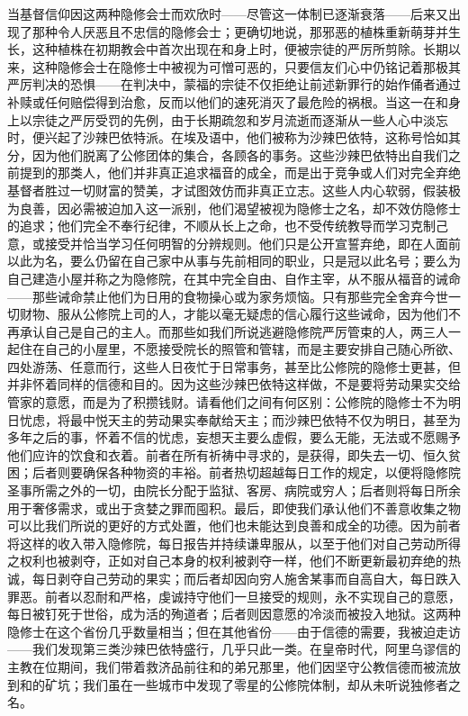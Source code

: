 当基督信仰因这两种隐修会士而欢欣时——尽管这一体制已逐渐衰落——后来又出现了那种令人厌恶且不忠信的隐修会士；更确切地说，那邪恶的植株重新萌芽并生长，这种植株在初期教会中首次出现在和身上时，便被宗徒的严厉所剪除。长期以来，这种隐修会士在隐修士中被视为可憎可恶的，只要信友们心中仍铭记着那极其严厉判决的恐惧——在判决中，蒙福的宗徒不仅拒绝让前述新罪行的始作俑者通过补赎或任何赔偿得到治愈，反而以他们的速死消灭了最危险的祸根。当这一在和身上以宗徒之严厉受罚的先例，由于长期疏忽和岁月流逝而逐渐从一些人心中淡忘时，便兴起了沙辣巴依特派。在埃及语中，他们被称为沙辣巴依特，这称号恰如其分，因为他们脱离了公修团体的集合，各顾各的事务。这些沙辣巴依特出自我们之前提到的那类人，他们并非真正追求福音的成全，而是出于竞争或人们对完全弃绝基督者胜过一切财富的赞美，才试图效仿而非真正立志。这些人内心软弱，假装极为良善，因必需被迫加入这一派别，他们渴望被视为隐修士之名，却不效仿隐修士的追求；他们完全不奉行纪律，不顺从长上之命，也不受传统教导而学习克制己意，或接受并恰当学习任何明智的分辨规则。他们只是公开宣誓弃绝，即在人面前以此为名，要么仍留在自己家中从事与先前相同的职业，只是冠以此名号；要么为自己建造小屋并称之为隐修院，在其中完全自由、自作主宰，从不服从福音的诫命——那些诫命禁止他们为日用的食物操心或为家务烦恼。只有那些完全舍弃今世一切财物、服从公修院上司的人，才能以毫无疑虑的信心履行这些诫命，因为他们不再承认自己是自己的主人。而那些如我们所说逃避隐修院严厉管束的人，两三人一起住在自己的小屋里，不愿接受院长的照管和管辖，而是主要安排自己随心所欲、四处游荡、任意而行，这些人日夜忙于日常事务，甚至比公修院的隐修士更甚，但并非怀着同样的信德和目的。因为这些沙辣巴依特这样做，不是要将劳动果实交给管家的意愿，而是为了积攒钱财。请看他们之间有何区别：公修院的隐修士不为明日忧虑，将最中悦天主的劳动果实奉献给天主；而沙辣巴依特不仅为明日，甚至为多年之后的事，怀着不信的忧虑，妄想天主要么虚假，要么无能，无法或不愿赐予他们应许的饮食和衣着。前者在所有祈祷中寻求的，是获得，即失去一切、恒久贫困；后者则要确保各种物资的丰裕。前者热切超越每日工作的规定，以便将隐修院圣事所需之外的一切，由院长分配于监狱、客房、病院或穷人；后者则将每日所余用于奢侈需求，或出于贪婪之罪而囤积。最后，即使我们承认他们不善意收集之物可以比我们所说的更好的方式处置，他们也未能达到良善和成全的功德。因为前者将这样的收入带入隐修院，每日报告并持续谦卑服从，以至于他们对自己劳动所得之权利也被剥夺，正如对自己本身的权利被剥夺一样，他们不断更新最初弃绝的热诚，每日剥夺自己劳动的果实；而后者却因向穷人施舍某事而自高自大，每日跌入罪恶。前者以忍耐和严格，虔诚持守他们一旦接受的规则，永不实现自己的意愿，每日被钉死于世俗，成为活的殉道者；后者则因意愿的冷淡而被投入地狱。这两种隐修士在这个省份几乎数量相当；但在其他省份——由于信德的需要，我被迫走访——我们发现第三类沙辣巴依特盛行，几乎只此一类。在皇帝时代，阿里乌谬信的主教在位期间，我们带着救济品前往和的弟兄那里，他们因坚守公教信德而被流放到和的矿坑；我们虽在一些城市中发现了零星的公修院体制，却从未听说独修者之名。\par

